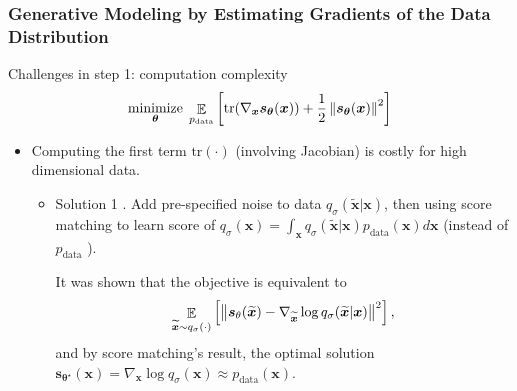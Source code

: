 \documentclass[10pt,xcolor={usenames,dvipsnames,table}]{beamer}
\begin{document}
\begin{frame}
    \frametitle{Generative Modeling by Estimating Gradients of the Data Distribution}

    Challenges in step 1: computation complexity
    \begin{equation*}
        \operatorname*{minimize}_{\boldsymbol \theta} \; \mathop{\mathbb{E}}_{p_{\text{data}}} \left[ \text{tr}(\nabla_{\bm{x}} \bm{s}_{\boldsymbol \theta}(\bm{x})) + \dfrac{1}{2} \left\lVert\bm{s}_{\boldsymbol \theta}(\bm{x})\right\rVert^2\right]
    \end{equation*}
    \begin{itemize}
        \item Computing the first term $\text{tr}(\cdot)$ (involving Jacobian) is costly for high dimensional data.
            \begin{itemize}
                \item Solution 1 \parencite{vincent2011connection}. Add pre-specified noise to data $q_{\sigma}(\widetilde{\bm{x}}| \bm{x})$, then using score matching to learn score of $q_{\sigma}(\bm{x}) = \int_{\bm{x}} q_{\sigma}(\widetilde{\bm{x}}| \bm{x}) p_{\text{data}}(\bm{x}) d \bm{x}$ (instead of $p_{\text{data}}$ ).

                    It was shown that the objective is equivalent to
                    \[
                    \mathop{\mathbb{E}}_{\widetilde{\bm{x}} \sim q_{\sigma}(\cdot)} \left[ \left\lVert\bm{s}_{\theta}(\widetilde{\bm{x}}) - \nabla_{\widetilde{\bm{x}}} \log q_{\sigma}(\widetilde{\bm{x}}| \bm{x})\right\rVert^2 \right],
                    \] 
                    and by score matching's result, the optimal solution $\bm{s}_{\boldsymbol \theta^{\star }} (\bm{x}) = \nabla_{\bm{x}} \log q_{\sigma}(\bm{x}) \approx p_{\text{data}}(\bm{x})$.

            \end{itemize}
    \end{itemize}
\end{frame}
\end{document}
